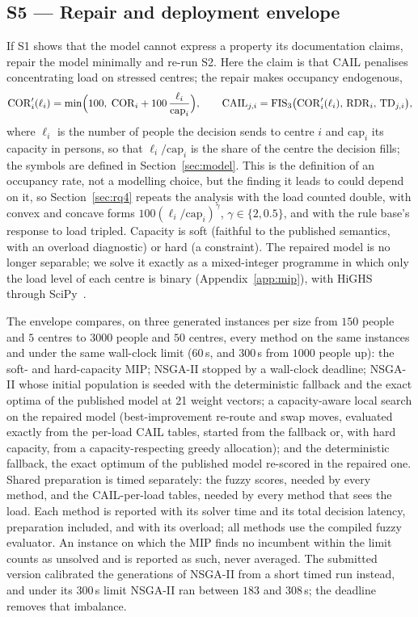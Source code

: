 \documentclass[systems,article,submit,moreauthors,pdftex]{Definitions/mdpi}
\begin{document}
\subsection{S5 --- Repair and deployment envelope}
If S1 shows that the model cannot express a property its documentation claims, repair the
model minimally and re-run S2. Here the claim is that CAIL penalises concentrating load on
stressed centres; the repair makes occupancy endogenous,
\begin{equation}
\mathrm{COR}'_i(\ell_i) = \min\Bigl(100,\; \mathrm{COR}_i + 100\,\frac{\ell_i}{\mathrm{cap}_i}\Bigr),
\qquad
\mathrm{CAIL}_{j,i} = \mathrm{FIS}_3\bigl(\mathrm{COR}'_i(\ell_i),\, \mathrm{RDR}_i,\, \mathrm{TD}_{j,i}\bigr),
\label{eq:repair}
\end{equation}
where $\ell_i$ is the number of people the decision sends to centre $i$ and
$\mathrm{cap}_i$ its capacity in persons, so that $\ell_i/\mathrm{cap}_i$ is the share of the
centre the decision fills; the symbols are defined in Section~\ref{sec:model}. This is the
definition of an occupancy rate, not a modelling choice, but the finding it leads to could
depend on it, so Section~\ref{sec:rq4} repeats the analysis with the load counted double, with
convex and concave forms $100(\ell_i/\mathrm{cap}_i)^{\gamma}$, $\gamma \in \{2, 0.5\}$, and with
the rule base's response to load tripled. Capacity is soft (faithful to the published semantics,
with an overload diagnostic) or hard (a constraint). The repaired model is no longer separable;
we solve it exactly as a mixed-integer programme in which only the load level of each centre is
binary (Appendix~\ref{app:mip}), with HiGHS~\cite{huangfu2018highs} through
SciPy~\cite{virtanen2020scipy}.

The envelope compares, on three generated instances per size from $150$ people and $5$ centres
to $3000$ people and $50$ centres, every method on the same instances and under the same
wall-clock limit ($60$\,s, and $300$\,s from $1000$ people up): the soft- and hard-capacity MIP;
NSGA-II stopped by a wall-clock deadline; NSGA-II whose initial population is seeded with the
deterministic fallback and the exact optima of the published model at 21 weight vectors; a
capacity-aware local search on the repaired model (best-improvement re-route and swap moves,
evaluated exactly from the per-load CAIL tables, started from the fallback or, with hard
capacity, from a capacity-respecting greedy allocation); and the deterministic fallback, the
exact optimum of the published model re-scored in the repaired one. Shared preparation is timed
separately: the fuzzy scores, needed by every method, and the CAIL-per-load tables, needed by
every method that sees the load. Each method is reported with its solver time and its total
decision latency, preparation included, and with its overload; all methods use the compiled
fuzzy evaluator. An instance on which the MIP finds no incumbent within the limit counts as
unsolved and is reported as such, never averaged. The submitted version calibrated the
generations of NSGA-II from a short timed run instead, and under its $300$\,s limit NSGA-II ran
between $183$ and $308$\,s; the deadline removes that imbalance.
\end{document}
